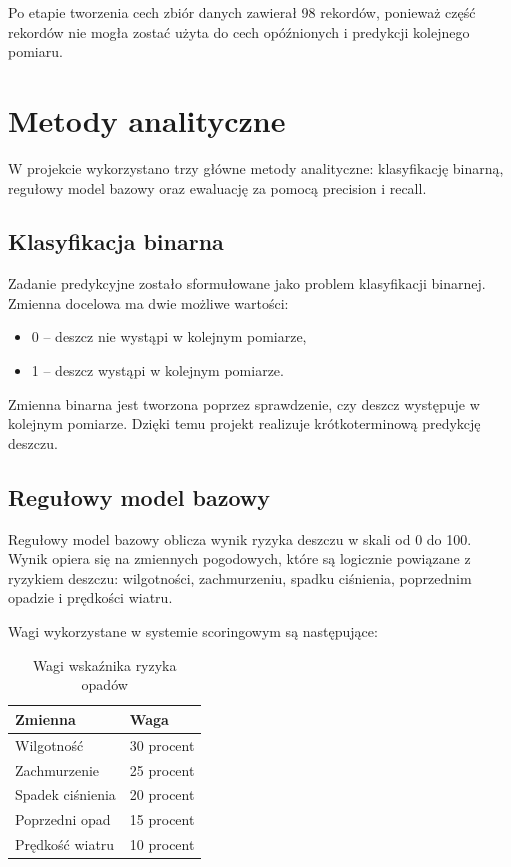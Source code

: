 \documentclass[12pt,a4paper]{article}
\begin{document}
Po etapie tworzenia cech zbiór danych zawierał 98 rekordów, ponieważ część rekordów nie mogła zostać użyta do cech opóźnionych i predykcji kolejnego pomiaru.

\section{Metody analityczne}

W projekcie wykorzystano trzy główne metody analityczne: klasyfikację binarną, regułowy model bazowy oraz ewaluację za pomocą precision i recall.

\subsection{Klasyfikacja binarna}

Zadanie predykcyjne zostało sformułowane jako problem klasyfikacji binarnej. Zmienna docelowa ma dwie możliwe wartości:

\begin{itemize}
\item 0 -- deszcz nie wystąpi w kolejnym pomiarze,
\item 1 -- deszcz wystąpi w kolejnym pomiarze.
\end{itemize}

Zmienna binarna jest tworzona poprzez sprawdzenie, czy deszcz występuje w kolejnym pomiarze. Dzięki temu projekt realizuje krótkoterminową predykcję deszczu.

\subsection{Regułowy model bazowy}

Regułowy model bazowy oblicza wynik ryzyka deszczu w skali od 0 do 100. Wynik opiera się na zmiennych pogodowych, które są logicznie powiązane z ryzykiem deszczu: wilgotności, zachmurzeniu, spadku ciśnienia, poprzednim opadzie i prędkości wiatru.

Wagi wykorzystane w systemie scoringowym są następujące:

\begin{table}[H]
\centering
\begin{tabular}{p{6cm} p{4cm}}
\toprule
\textbf{Zmienna} & \textbf{Waga} \\
\midrule
Wilgotność & 30 procent \\
Zachmurzenie & 25 procent \\
Spadek ciśnienia & 20 procent \\
Poprzedni opad & 15 procent \\
Prędkość wiatru & 10 procent \\
\bottomrule
\end{tabular}
\caption{Wagi wskaźnika ryzyka opadów}
\end{table}
\end{document}
